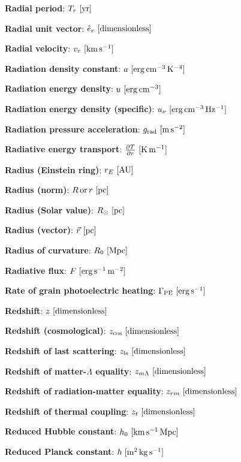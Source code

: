 \documentclass[a4paper,10pt]{article}
\begin{document}
{\noindent}\textbf{Radial period}: $T_r ~ [{\rm yr}]$

{\noindent}\textbf{Radial unit vector}: $\hat{e}_r ~ [{\rm dimensionless}]$

{\noindent}\textbf{Radial velocity}: $v_r ~ [{\rm km\,s^{-1}}]$

{\noindent}\textbf{Radiation density constant}: $a ~ [{\rm erg\,cm^{-3}\,K^{-4}}]$

{\noindent}\textbf{Radiation energy density}: $u ~ [{\rm erg\,cm^{-3}}]$

{\noindent}\textbf{Radiation energy density (specific)}: $u_\nu ~
[{\rm erg\,cm^{-3}\,Hz^{-1}}]$

{\noindent}\textbf{Radiation pressure acceleration}: $g_{\rm rad} ~ [{\rm m\,s^{-2}}]$

{\noindent}\textbf{Radiative energy transport}: $\frac{\partial T}{\partial r} ~ [{\rm K\,m^{-1}}]$

{\noindent}\textbf{Radius (Einstein ring)}: $r_E ~ [{\rm AU}]$

{\noindent}\textbf{Radius (norm)}: $R\,{\rm or}\,r ~ [{\rm pc}]$

{\noindent}\textbf{Radius (Solar value)}: $R_\odot ~ [{\rm pc}]$

{\noindent}\textbf{Radius (vector)}: $\vec{r} ~ [{\rm pc}]$

{\noindent}\textbf{Radius of curvature}: $R_0 ~ [{\rm Mpc}]$

{\noindent}\textbf{Radiative flux}: $F ~ [{\rm erg\,s^{-1}\,m^{-2}}]$

{\noindent}\textbf{Rate of grain photoelectric heating}: $\Gamma_{\rm PE} ~ [{\rm erg\,s^{-1}}]$

{\noindent}\textbf{Redshift}: $z ~ [{\rm dimensionless}]$

{\noindent}\textbf{Redshift (cosmological)}: $z_\mathrm{cos} ~ [{\rm dimensionless}]$

{\noindent}\textbf{Redshift of last scattering}: $z_\mathrm{ls} ~ [{\rm dimensionless}]$

{\noindent}\textbf{Redshift of matter-$\Lambda$ equality}: $z_{m\Lambda} ~ [{\rm dimensionless}]$

{\noindent}\textbf{Redshift of radiation-matter equality}: $z_{rm} ~ [{\rm dimensionless}]$

{\noindent}\textbf{Redshift of thermal coupling}: $z_t ~ [{\rm dimensionless}]$

{\noindent}\textbf{Reduced Hubble constant}: $h_0 ~ [{\rm km\,s^{-1}\,Mpc}]$

{\noindent}\textbf{Reduced Planck constant}: $\hbar ~ [{\rm m^2\,kg\,s^{-1}}]$
\end{document}
